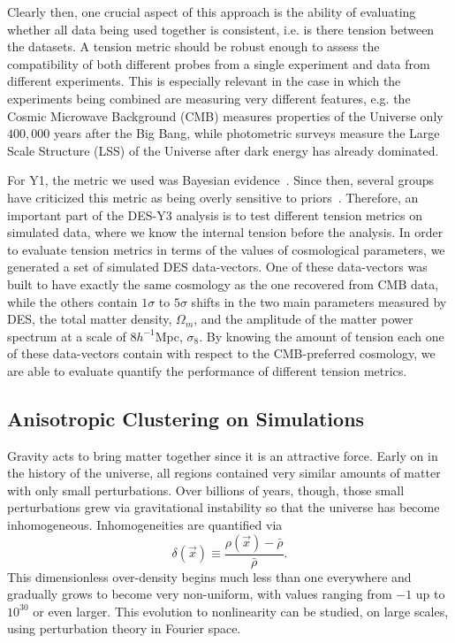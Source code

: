 \documentclass[12pt]{article}
\newcommand\be{\begin{equation}}
\def\ee{\end{equation}}
\begin{document}
\begin{small}
Clearly then, one crucial aspect of this approach is the ability of evaluating whether all data being used together is consistent, i.e. is there tension between the datasets. A tension metric should be robust enough to assess the compatibility of both different probes from a single experiment and data from different experiments. This is especially relevant in the case in which the experiments being combined are measuring very different features, e.g. the Cosmic Microwave Background (CMB) measures properties of the Universe only  $400,000$  years after the  Big  Bang, while photometric surveys measure the Large Scale Structure (LSS) of the Universe after dark energy has already dominated.

For Y1, the metric we used was Bayesian evidence~\cite{Marshall:2003ez}. Since then, several groups have criticized this metric as being overly sensitive to priors~\cite{Raveri:2018wln,Handley:2019wlz}. Therefore, an important part of the DES-Y3 analysis is to test different tension metrics on simulated data, where we know the internal tension before the analysis. %
In order to evaluate tension metrics in terms of the values of cosmological parameters, we generated a set of simulated DES data-vectors. One of these data-vectors was built to have exactly the same cosmology as the one recovered from CMB data, while the others contain $1\sigma$ to $5\sigma$ shifts in the two main parameters measured by DES, the total matter density, $\Omega_m$, and the amplitude of the matter power spectrum at a scale of $8h^{-1}$Mpc, $\sigma_8$. By knowing the amount of tension each one of these data-vectors contain with respect to the CMB-preferred cosmology, we are able to evaluate quantify the performance of different tension metrics.



\subsection{Anisotropic Clustering on Simulations}
Gravity acts to bring matter together since it is an attractive force. Early on in the history of the universe, all regions contained very similar amounts of matter with only small perturbations. Over billions of years, though, those small perturbations grew via gravitational instability so that the universe has become inhomogeneous. Inhomogeneities are quantified via
\be
\delta(\vec x) \equiv \frac{\rho(\vec x) - \bar\rho}{\bar\rho}.\ee
This dimensionless over-density begins much less than one everywhere and gradually grows to become very non-uniform, with values ranging from $-1$ up to $10^{30}$ or even larger. This evolution to nonlinearity can be studied, on large scales, using perturbation theory in Fourier space.


\end{small}
\end{document}
